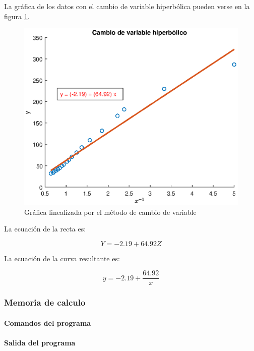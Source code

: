 \documentclass[letter,11pt]{article}
\begin{document}
La gráfica de los datos con el cambio de variable hiperbólica pueden verse en la
figura \ref{practica31_3}.

\begin{figure}[!h]
\centering
\includegraphics[scale=1.00]{eps/3.1.3.eps}
\caption{Gráfica linealizada por el método de cambio de variable}
\label{practica31_3}
\end{figure}

La ecuación de la recta es:

\begin{equation}
    Y = -2.19 + 64.92 Z
\end{equation}

La ecuación de la curva resultante es:

\begin{equation}
    y = -2.19 + \frac{64.92}{x}
\end{equation}

\subsubsection{Memoria de calculo}

\paragraph{Comandos del programa}
\begin{alltt}
\footnotesize

\normalsize
\end{alltt}

\paragraph{Salida del programa}
\begin{alltt}
\footnotesize

\normalsize
\end{alltt}
\end{document}
